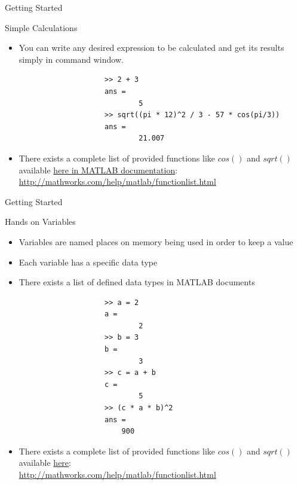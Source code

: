 \documentclass{beamer}
\begin{document}
\begin{frame}[fragile]{Getting Started}
	\begin{block}{Simple Calculations}
		\begin{itemize}
			\item You can write any desired expression to be calculated and get its results simply in command window.
			\java
				\begin{lstlisting}
					>> 2 + 3
					ans = 
							5
					>> sqrt((pi * 12)^2 / 3 - 57 * cos(pi/3)) 
					ans =
							21.007
				\end{lstlisting}
			\item There exists a complete list of provided functions like $cos()$ and $sqrt()$ available \href{http://mathworks.com/help/matlab/functionlist.html}{here in MATLAB documentation}:\\
			\url{http://mathworks.com/help/matlab/functionlist.html}
		\end{itemize}
	\end{block}
\end{frame}

\begin{frame}[fragile]{Getting Started}
	\begin{block}{Hands on Variables}
		\begin{itemize}
			\item Variables are named places on memory being used in order to keep a value
			\item Each variable has a specific data type
			\item There exists a list of defined data types in MATLAB documents
			\java
				\begin{lstlisting}
					>> a = 2
					a = 
							2
					>> b = 3
					b =
							3
					>> c = a + b
					c =
							5
					>> (c * a * b)^2
					ans =
						900
				\end{lstlisting}
			\item There exists a complete list of provided functions like $cos()$ and $sqrt()$ available \href{http://mathworks.com/help/matlab/functionlist.html}{here}:\\
			\url{http://mathworks.com/help/matlab/functionlist.html}
		\end{itemize}
	\end{block}
\end{frame}
\end{document}

